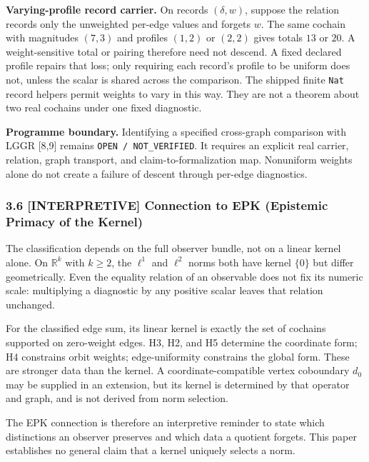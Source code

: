 \documentclass[
  11pt,
]{article}
\begin{document}
\textbf{Varying-profile record carrier.} On records \((\delta,w)\),
suppose the relation records only the unweighted per-edge values and
forgets \(w\). The same cochain with magnitudes \((7,3)\) and profiles
\((1,2)\) or \((2,2)\) gives totals \(13\) or \(20\). A weight-sensitive
total or pairing therefore need not descend. A fixed declared profile
repairs that loss; only requiring each record's profile to be uniform
does not, unless the scalar is shared across the comparison. The shipped
finite \texttt{Nat} record helpers permit weights to vary in this way.
They are not a theorem about two real cochains under one fixed
diagnostic.

\textbf{Programme boundary.} Identifying a specified cross-graph
comparison with LGGR {[}8,9{]} remains
\texttt{OPEN /\allowbreak{} NOT\_\allowbreak{}VERIFIED}. It requires an
explicit real carrier, relation, graph transport, and
claim-to-formalization map. Nonuniform weights alone do not create a
failure of descent through per-edge diagnostics.

\hypertarget{interpretive-connection-to-epk-epistemic-primacy-of-the-kernel}{%
\subsubsection{\texorpdfstring{3.6 \textbf{{[}INTERPRETIVE{]}}
Connection to EPK (Epistemic Primacy of the
Kernel)}{3.6 {[}INTERPRETIVE{]} Connection to EPK (Epistemic Primacy of the Kernel)}}\label{interpretive-connection-to-epk-epistemic-primacy-of-the-kernel}}

The classification depends on the full observer bundle, not on a linear
kernel alone. On \(\mathbb R^k\) with \(k\ge2\), the \(\ell^1\) and
\(\ell^2\) norms both have kernel \(\{0\}\) but differ geometrically.
Even the equality relation of an observable does not fix its numeric
scale: multiplying a diagnostic by any positive scalar leaves that
relation unchanged.

For the classified edge sum, its linear kernel is exactly the set of
cochains supported on zero-weight edges. H3, H2, and H5 determine the
coordinate form; H4 constrains orbit weights; edge-uniformity constrains
the global form. These are stronger data than the kernel. A
coordinate-compatible vertex coboundary \(d_0\) may be supplied in an
extension, but its kernel is determined by that operator and graph, and
is not derived from norm selection.

The EPK connection is therefore an interpretive reminder to state which
distinctions an observer preserves and which data a quotient forgets.
This paper establishes no general claim that a kernel uniquely selects a
norm.
\end{document}
